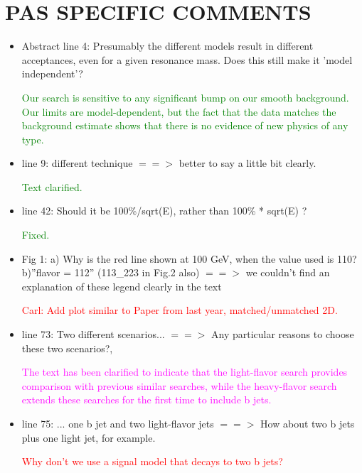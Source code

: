 \documentclass[paper=a4, fontsize=11pt]{scrartcl}
\begin{document}
\section{PAS SPECIFIC COMMENTS}
\begin{itemize}
\item Abstract line 4: Presumably the different models result in different acceptances, even for a given resonance mass. Does this still make it 'model independent'?

\textcolor{green}{Our search is sensitive to any significant bump on our
smooth background. Our limits are model-dependent, but the fact that the data
matches the background estimate shows that there is no evidence of new physics
of any type.}\\

\item line 9: different technique $==>$ better to say a little bit clearly.

\textcolor{green}{Text clarified.}\\

\item line 42: Should it be 100\%/sqrt(E), rather than 100\% * sqrt(E) ?

\textcolor{green}{Fixed.}\\

\item Fig 1: a) Why is the red line shown at 100 GeV, when the value used is 110? b)''flavor = 112'' (113\_223 in Fig.2 also) $==>$ we couldn't find an explanation of these legend clearly in the text

\textcolor{red}{Carl: Add plot similar to Paper from last year, matched/unmatched 2D.}\\

\item line 73: Two different scenarios... $==>$ Any particular reasons to choose these two scenarios?,

\textcolor{magenta}{The text has been clarified to indicate that the
light-flavor search provides comparison with previous similar searches,
while the heavy-flavor search extends these searches for the first time to
include b jets.}\\


\item line 75: ... one b jet and two light-flavor jets $==>$ How about two b jets plus one light jet, for example.

\textcolor{red}{Why don't we use a signal model that decays to two b jets?}\\


\end{itemize}
\end{document}
